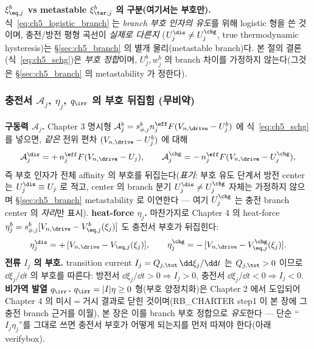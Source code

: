 \begin{boundbox}
\textbf{$\xi_{\eq,j}^b$ vs metastable $\xi_{\tar,j}^b$ 의 구분(여기서는 부호만).} 식~\eqref{eq:ch5_logistic_branch}
는 \emph{branch 부호 인자의 유도}를 위해 logistic 형을 쓴 것이며, 충전/방전 평형 곡선이 \emph{실제로 다른지}
($U_j^\dis\ne U_j^\chg$, true thermodynamic hysteresis)는 \S\ref{sec:ch5_branch} 의 별개 물리(metastable
branch)다. 본 절의 결론(식~\eqref{eq:ch5_schg})은 \emph{부호 정합}이며, $U_j^b,w_j^b$ 의 branch 차이를
가정하지 않는다(그것은 \S\ref{sec:ch5_branch} 의 metastability 가 정한다).
\end{boundbox}

\subsubsection{충전서 $\mathcal A_j$, $\eta_j$, $q_\irr$ 의 부호 뒤집힘 (무비약)}\label{sec:ch5_sign_flip}
\textbf{구동력 $\mathcal A_j$.} Chapter 3 명시형 $\mathcal A_j^b=s_{\phi,j}^b n_j^{\eff}F(V_{n,\drive}-U_j^b)$
에 식~\eqref{eq:ch5_schg} 를 넣으면, \emph{같은} 전위 편차 $(V_{n,\drive}-U_j^b)$ 에 대해
\begin{equation}
\mathcal A_j^\dis=+\,n_j^{\eff}F(V_{n,\drive}-U_j),\qquad
\mathcal A_j^\chg=-\,n_j^{\eff}F(V_{n,\drive}-U_j^\chg),
\label{eq:ch5_A_branch}
\end{equation}
즉 부호 인자가 전체 affinity 의 부호를 뒤집는다(\emph{표기}: 부호 유도 단계서 방전 center 는 $U_j^\dis\equiv U_j$
로 적고, center 의 branch 분기 $U_j^\dis\ne U_j^\chg$ 자체는 가정하지 않으며 \S\ref{sec:ch5_branch} metastability 로
이연한다 — 여기 $U_j^\chg$ 는 충전 branch center 의 \emph{자리}만 표시). \textbf{heat-force $\eta_j$.} 마찬가지로 Chapter 4 의
heat-force $\eta_j^b=s_{\phi,j}^b[V_{n,\drive}-V_{\eq,j}^b(\xi_j)]$ 도 충전서 부호가 뒤집힌다:
\begin{equation}
\eta_j^\dis=+\,[V_{n,\drive}-V_{\eq,j}(\xi_j)],\qquad
\eta_j^\chg=-\,[V_{n,\drive}-V_{\eq,j}^\chg(\xi_j)].
\label{eq:ch5_eta_branch}
\end{equation}
\textbf{전류 $I_j$ 의 부호.} transition current $I_j=Q_{j,\tot}\,\dd\xi_j/\dd t$ 는 $Q_{j,\tot}>0$ 이므로
$\dd\xi_j/\dd t$ 의 부호를 따른다: 방전서 $\dd\xi_j/\dd t>0\Rightarrow I_j>0$, 충전서 $\dd\xi_j/\dd t<0\Rightarrow
I_j<0$. \textbf{비가역 발열 $q_\irr$.} $q_\irr=|I|\eta\ge0$ 형(부호 양정치화)은 Chapter 2 에서 도입되어
Chapter 4 의 미시$=$거시 결과로 닫힌 것이며(RB\_CHARTER step1 이 본 장에 그 충전 branch 근거를 이월), 본 장은
이를 branch 부호 정합으로 \emph{유도}한다 — 단순 ``$I_j\eta_j$''를 그대로 쓰면 충전서 부호가 어떻게 되는지를 먼저
따져야 한다(아래 verifybox).

